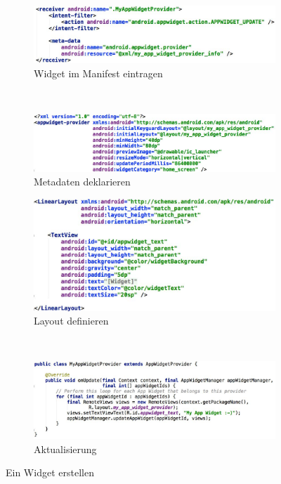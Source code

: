 \begin{figure}
	\centering
	\begin{subfigure}[b]{0.4\textwidth}
		\includegraphics[width=\textwidth]{fig/widget-manifest}
		\caption{Widget im Manifest eintragen}
	\end{subfigure}
	~
	\begin{subfigure}[b]{0.4\textwidth}
		\includegraphics[width=\textwidth]{fig/widget-info}
		\caption{Metadaten deklarieren}
	\end{subfigure}
	\begin{subfigure}[b]{0.4\textwidth}
		\includegraphics[width=\textwidth]{fig/widget-layout}
		\caption{Layout definieren}
	\end{subfigure}
	~
	\begin{subfigure}[b]{0.4\textwidth}
		\includegraphics[width=\textwidth]{fig/widget-klasse}
		\caption{Aktualisierung}
	\end{subfigure}
	\caption{Ein Widget erstellen}
	\label{fig:widget}
\end{figure}

